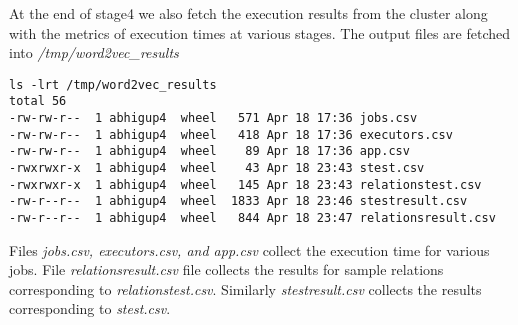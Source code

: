 At the end of stage4 we also fetch the execution results from the cluster along with the 
metrics of execution times at various stages. The output files are fetched into \textit{/tmp/word2vec\_results}
\begin{verbatim}
ls -lrt /tmp/word2vec_results
total 56
-rw-rw-r--  1 abhigup4  wheel   571 Apr 18 17:36 jobs.csv
-rw-rw-r--  1 abhigup4  wheel   418 Apr 18 17:36 executors.csv
-rw-rw-r--  1 abhigup4  wheel    89 Apr 18 17:36 app.csv
-rwxrwxr-x  1 abhigup4  wheel    43 Apr 18 23:43 stest.csv
-rwxrwxr-x  1 abhigup4  wheel   145 Apr 18 23:43 relationstest.csv
-rw-r--r--  1 abhigup4  wheel  1833 Apr 18 23:46 stestresult.csv
-rw-r--r--  1 abhigup4  wheel   844 Apr 18 23:47 relationsresult.csv
\end{verbatim}
Files \textit{jobs.csv, executors.csv, and app.csv} collect the execution time for various jobs. 
File \textit{relationsresult.csv} file collects the results for sample relations corresponding to
\textit{relationstest.csv}. Similarly \textit{stestresult.csv} collects the results corresponding to \textit{stest.csv}.

